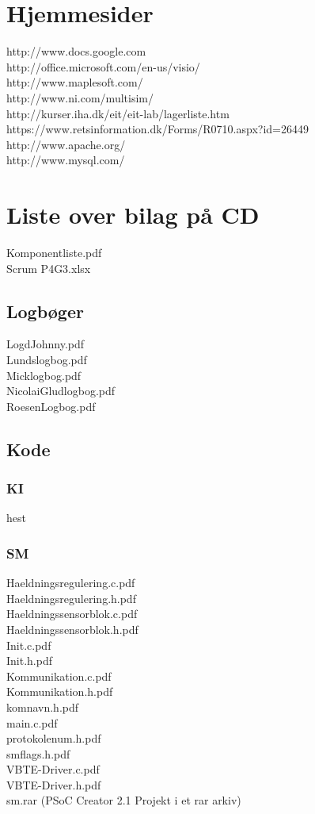 \section{Hjemmesider}
http://www.docs.google.com\\
http://office.microsoft.com/en-us/visio/\\
http://www.maplesoft.com/\\
http://www.ni.com/multisim/\\
http://kurser.iha.dk/eit/eit-lab/lagerliste.htm\\
https://www.retsinformation.dk/Forms/R0710.aspx?id=26449\\
http://www.apache.org/\\
http://www.mysql.com/\\

\section{Liste over bilag på CD}
Komponentliste.pdf\\
Scrum P4G3.xlsx\\
\subsection{Logbøger}
LogdJohnny.pdf\\
Lundslogbog.pdf\\
Micklogbog.pdf\\
NicolaiGludlogbog.pdf\\
RoesenLogbog.pdf\\
\subsection{Kode}
\subsubsection{KI}
hest
\subsubsection{SM}
Haeldningsregulering.c.pdf\\
Haeldningsregulering.h.pdf\\
Haeldningssensorblok.c.pdf\\
Haeldningssensorblok.h.pdf\\
Init.c.pdf\\
Init.h.pdf\\
Kommunikation.c.pdf\\
Kommunikation.h.pdf\\
komnavn.h.pdf\\
main.c.pdf\\
protokolenum.h.pdf\\
smflags.h.pdf\\
VBTE-Driver.c.pdf\\
VBTE-Driver.h.pdf\\
sm.rar (PSoC Creator 2.1 Projekt i et rar arkiv)\\
